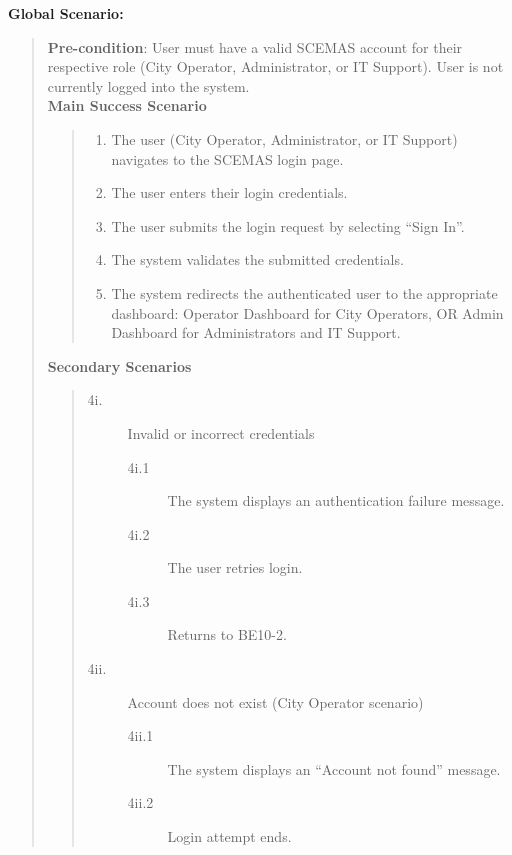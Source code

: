 \documentclass[]{article}
\begin{document}
\begin{enumerate}[{\bf BE10.}]
    {\bf Global Scenario:}
        \begin{quote}
            \textbf{Pre-condition}: User must have a valid SCEMAS account for their respective role (City Operator, Administrator, or IT Support). User is not currently logged into the system.\\
            \textbf{Main Success Scenario}
            \begin{quote}
                \begin{enumerate}[1.]
                    \item The user (City Operator, Administrator, or IT Support) navigates to the SCEMAS login page.
                    \item The user enters their login credentials.
                    \item The user submits the login request by selecting ``Sign In''.
                    \item The system validates the submitted credentials.
                    \item The system redirects the authenticated user to the appropriate dashboard: Operator Dashboard for City Operators, OR Admin Dashboard for Administrators and IT Support.
                \end{enumerate}
            \end{quote}
            \textbf{Secondary Scenarios}
            \begin{quote}
                \begin{description}
                    \item[\textmd{4i.}] Invalid or incorrect credentials
                    \begin{description}
                        \item[\textmd{4i.1}] The system displays an authentication failure message.
                        \item[\textmd{4i.2}] The user retries login.
                        \item[\textmd{4i.3}] Returns to BE10-2.
                    \end{description}

                    \item[\textmd{4ii.}] Account does not exist (City Operator scenario)
                    \begin{description}
                        \item[\textmd{4ii.1}] The system displays an ``Account not found'' message.
                        \item[\textmd{4ii.2}] Login attempt ends.
                    \end{description}


\end{description}
\end{quote}
\end{quote}
\end{enumerate}
\end{document}

